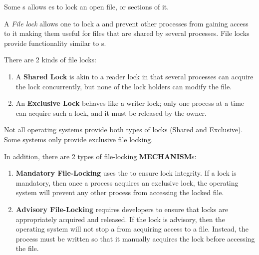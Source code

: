 Some s allows es to lock an open file, or sections of it.
\begin{definition}\label{def:File_Lock}
  A \emph{File lock} allows one  to lock a  and prevent other processes from gaining access to it making them useful for files that are shared by several processes.
  File locks provide functionality similar to s.

  There are 2 kinds of file locks:
  \begin{enumerate}[noitemsep]
  \item A \textbf{Shared Lock} is akin to a reader lock in that several processes can acquire the lock concurrently, but none of the lock holders can modify the file.
  \item An \textbf{Exclusive Lock} behaves like a writer lock; only one process at a time can acquire such a lock, and it must be released by the owner.
  \end{enumerate}

  \begin{remark}
    Not all operating systems provide both types of locks (Shared and Exclusive).
    Some systems only provide exclusive file locking.
  \end{remark}

  In addition, there are 2 types of file-locking \textbf{MECHANISM}s:
  \begin{enumerate}[noitemsep]
  \item \textbf{Mandatory File-Locking} uses the  to ensure lock integrity.
    If a lock is mandatory, then once a process acquires an exclusive lock, the operating system will prevent any other process from accessing the locked file.
  \item \textbf{Advisory File-Locking} requires developers to ensure that locks are appropriately acquired and released.
    If the lock is advisory, then the operating system will not stop a  from acquiring access to a file.
    Instead, the process must be written so that it manually acquires the lock before accessing the file.
  \end{enumerate}

\end{definition}

